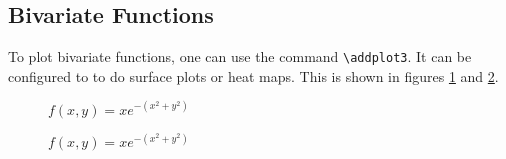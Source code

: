 \documentclass[12pt]{article}
\begin{document}


\subsection{Bivariate Functions}
To plot bivariate functions, one can use the command \verb|\addplot3|. It can be configured to to do surface plots or heat maps. This is shown in figures \ref{Fig:BivariateGaussian3D} and \ref{Fig:BivariateGaussianHeatMap}. 

\pgfplotsset{width=16cm,height=10cm,compat=1.9}

\begin{figure}[h]
\centering
\caption{$f(x,y) = x e^{-(x^2+y^2)}$}
\label{Fig:BivariateGaussian3D}
\end{figure}



\begin{figure}[h]
\centering
\caption{$f(x,y) = x e^{-(x^2+y^2)}$}
\label{Fig:BivariateGaussianHeatMap}
\end{figure}






\end{document}
